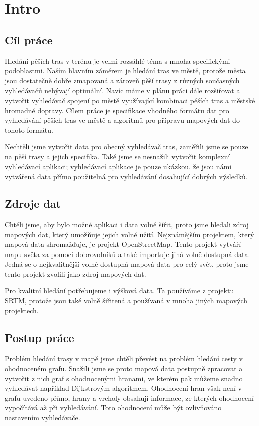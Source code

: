 \chapter{Intro}

\section{Cíl práce}
Hledání pěších tras v terénu je velmi rozsáhlé téma s mnoha specifickými
podoblastmi. Naším hlavním záměrem je hledání tras ve městě,
protože města jsou dostatečně dobře zmapovaná a zároveň pěší trasy z různých
současných vyhledávačů nebývají optimální. Navíc máme v plánu práci dále
rozšiřovat a vytvořit vyhledávač spojení po městě využívající kombinaci pěších
tras a městské hromadné dopravy.  Cílem práce je specifikace vhodného formátu
dat pro vyhledávání pěších tras ve městě a algoritmů pro přípravu mapových dat
do tohoto formátu. 

Nechtěli jsme vytvořit data pro obecný vyhledávač tras, zaměřili jsme se
pouze na pěší trasy a jejich specifika. Také jsme se nesnažili vytvořit komplexní
vyhledávací aplikaci; vyhledávací aplikace je pouze ukázkou, že jsou námi
vytvářená data přímo použitelná pro vyhledávání dosahující dobrých výsledků.

\section{Zdroje dat}
Chtěli jsme, aby bylo možné aplikaci i data volně šířit, proto jsme hledali
zdroj mapových dat, který umožňuje jejich volné užití. Nejznámějším projektem,
který mapová data shromažďuje, je projekt OpenStreetMap. Tento projekt vytváří
mapu světa za pomoci dobrovolníků a také importuje jiná volně dostupná data.
Jedná se o nejkvalitnější volně dostupná mapová data pro celý svět, proto jsme
tento projekt zvolili jako zdroj mapových dat.

Pro kvalitní hledání potřebujeme i výšková data. Ta používáme z projektu SRTM,
\cite{srtmweb} protože jsou také volně šiřitená a používaná v mnoha jiných
mapových projektech.

\section{Postup práce}
Problém hledání trasy v mapě jsme chtěli převést na problém hledání cesty v
ohodnoceném grafu. Snažili jsme se proto mapová data postupně zpracovat a
vytvořit z nich graf s ohodnocenými hranami, ve kterém pak můžeme snadno
vyhledávat například Dijkstrovým algoritmem. Ohodnocení hran však není v grafu
uvedeno přímo, hrany a vrcholy obsahují informace, ze kterých ohodnocení
vypočítává až při vyhledávání. Toto ohodnocení může být ovlivňováno nastavením
vyhledávače.


